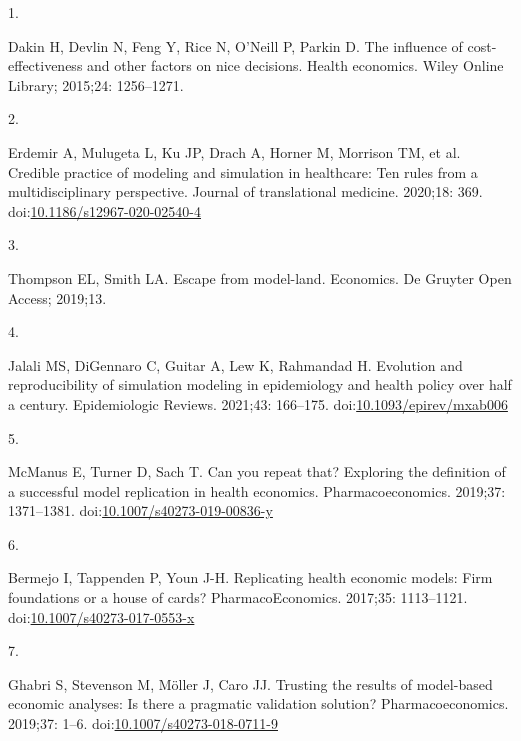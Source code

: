 \documentclass[
]{article}
\newlength{\cslhangindent}
\newlength{\csllabelwidth}
\newlength{\cslentryspacingunit} %
\newenvironment{CSLReferences}[2] %
 {%
  \setlength{\parindent}{0pt}
  \ifodd #1
  \let\oldpar\par
  \def\par{\hangindent=\cslhangindent\oldpar}
  \fi
  \setlength{\parskip}{#2\cslentryspacingunit}
 }%
 {}
\newcommand{\CSLLeftMargin}[1]{\parbox[t]{\csllabelwidth}{#1}}
\newcommand{\CSLRightInline}[1]{\parbox[t]{\linewidth - \csllabelwidth}{#1}\break}
\begin{document}
\hypertarget{refs}{}
\begin{CSLReferences}{0}{0}
\leavevmode{}%
\CSLLeftMargin{1. }%
\CSLRightInline{Dakin H, Devlin N, Feng Y, Rice N, O'Neill P, Parkin D. The influence of cost-effectiveness and other factors on nice decisions. Health economics. Wiley Online Library; 2015;24: 1256--1271. }

\leavevmode{}%
\CSLLeftMargin{2. }%
\CSLRightInline{Erdemir A, Mulugeta L, Ku JP, Drach A, Horner M, Morrison TM, et al. Credible practice of modeling and simulation in healthcare: Ten rules from a multidisciplinary perspective. Journal of translational medicine. 2020;18: 369. doi:\href{https://doi.org/10.1186/s12967-020-02540-4}{10.1186/s12967-020-02540-4}}

\leavevmode{}%
\CSLLeftMargin{3. }%
\CSLRightInline{Thompson EL, Smith LA. Escape from model-land. Economics. De Gruyter Open Access; 2019;13. }

\leavevmode{}%
\CSLLeftMargin{4. }%
\CSLRightInline{Jalali MS, DiGennaro C, Guitar A, Lew K, Rahmandad H. Evolution and reproducibility of simulation modeling in epidemiology and health policy over half a century. Epidemiologic Reviews. 2021;43: 166--175. doi:\href{https://doi.org/10.1093/epirev/mxab006}{10.1093/epirev/mxab006}}

\leavevmode{}%
\CSLLeftMargin{5. }%
\CSLRightInline{McManus E, Turner D, Sach T. Can you repeat that? Exploring the definition of a successful model replication in health economics. Pharmacoeconomics. 2019;37: 1371--1381. doi:\href{https://doi.org/10.1007/s40273-019-00836-y}{10.1007/s40273-019-00836-y}}

\leavevmode{}%
\CSLLeftMargin{6. }%
\CSLRightInline{Bermejo I, Tappenden P, Youn J-H. Replicating health economic models: Firm foundations or a house of cards? PharmacoEconomics. 2017;35: 1113--1121. doi:\href{https://doi.org/10.1007/s40273-017-0553-x}{10.1007/s40273-017-0553-x}}

\leavevmode{}%
\CSLLeftMargin{7. }%
\CSLRightInline{Ghabri S, Stevenson M, Möller J, Caro JJ. Trusting the results of model-based economic analyses: Is there a pragmatic validation solution? Pharmacoeconomics. 2019;37: 1--6. doi:\href{https://doi.org/10.1007/s40273-018-0711-9}{10.1007/s40273-018-0711-9}}


\end{CSLReferences}
\end{document}

